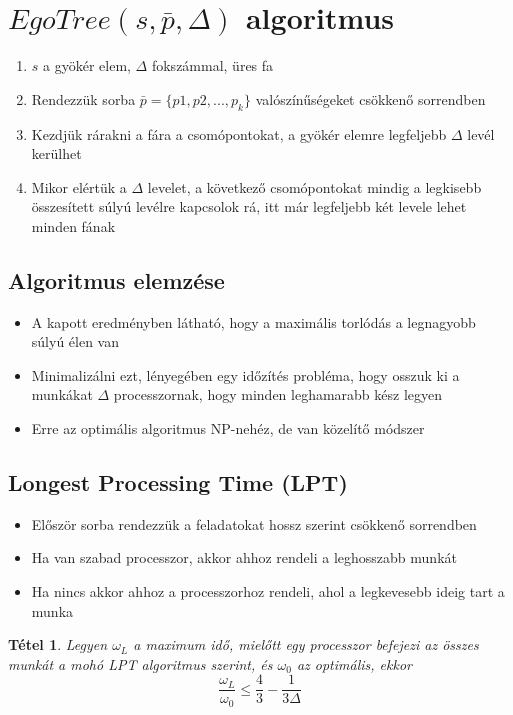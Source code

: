 \documentclass[12pt]{report}
\newtheorem{mytetel}{Tétel}
\begin{document}
\section{\(EgoTree(s, \bar{p}, \Delta)\) algoritmus}

\begin{enumerate}
	\item \(s\) a gyökér elem, \(\Delta\) fokszámmal, üres fa
	\item Rendezzük sorba \(\bar{p} = \{p1, p2, ..., p_k\}\) valószínűségeket csökkenő sorrendben
	\item Kezdjük rárakni a fára a csomópontokat, a gyökér elemre legfeljebb \(\Delta\) levél kerülhet
	\item Mikor elértük a \(\Delta\) levelet, a következő csomópontokat mindig a legkisebb összesített súlyú levélre kapcsolok rá, itt már legfeljebb két levele lehet minden fának
\end{enumerate}

\subsection{Algoritmus elemzése}

\begin{itemize}
	\item A kapott eredményben látható, hogy a maximális torlódás a legnagyobb súlyú élen van
	\item Minimalizálni ezt, lényegében egy időzítés probléma, hogy osszuk ki a munkákat \(\Delta\) processzornak, hogy minden leghamarabb kész legyen
	\item Erre az optimális algoritmus NP-nehéz, de van közelítő módszer
\end{itemize}

\subsection{Longest Processing Time (LPT)}

\begin{itemize}
	\item Először sorba rendezzük a feladatokat hossz szerint csökkenő sorrendben
	\item Ha van szabad processzor, akkor ahhoz rendeli a leghosszabb munkát
	\item Ha nincs akkor ahhoz a processzorhoz rendeli, ahol a legkevesebb ideig tart a munka
\end{itemize}
\begin{mytetel}
	Legyen \(\omega_L\) a maximum idő, mielőtt egy processzor befejezi az összes munkát a mohó LPT algoritmus szerint, és \(\omega_0\) az optimális, ekkor \[\frac{\omega_L}{\omega_0} \le \frac{4}{3} - \frac{1}{3\Delta}\]
\end{mytetel}
\end{document}
